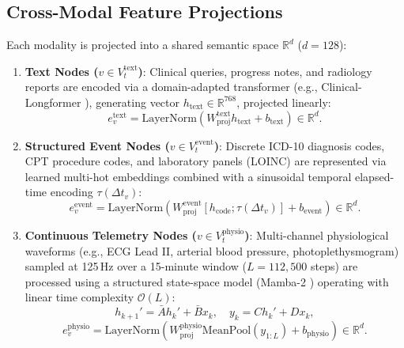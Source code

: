 \documentclass[ijds,dblanonrev]{informs4}
\newcommand{\R}{\mathbb{R}}
\begin{document}
\subsection{Cross-Modal Feature Projections}
Each modality is projected into a shared semantic space $\R^d$ ($d = 128$):
\begin{enumerate}[(1)]
  \item \textbf{Text Nodes ($v \in V_t^{\text{text}}$)}: Clinical queries, progress notes, and radiology reports are encoded via a domain-adapted transformer (e.g., Clinical-Longformer \citep{alsentzer2019publicly}), generating vector $h_{\text{text}} \in \R^{768}$, projected linearly:
  \begin{equation}
    e_v^{\text{text}} = \text{LayerNorm}(W_{\text{proj}}^{\text{text}} h_{\text{text}} + b_{\text{text}}) \in \R^d.
    \label{eq:text_proj}
  \end{equation}

  \item \textbf{Structured Event Nodes ($v \in V_t^{\text{event}}$)}: Discrete ICD-10 diagnosis codes, CPT procedure codes, and laboratory panels (LOINC) are represented via learned multi-hot embeddings combined with a sinusoidal temporal elapsed-time encoding $\tau(\Delta t_{v})$:
  \begin{equation}
    e_v^{\text{event}} = \text{LayerNorm}(W_{\text{proj}}^{\text{event}} [h_{\text{code}}; \tau(\Delta t_v)] + b_{\text{event}}) \in \R^d.
    \label{eq:event_proj}
  \end{equation}

  \item \textbf{Continuous Telemetry Nodes ($v \in V_t^{\text{physio}}$)}: Multi-channel physiological waveforms (e.g., ECG Lead II, arterial blood pressure, photoplethysmogram) sampled at 125\,Hz over a 15-minute window ($L = 112{,}500$ steps) are processed using a structured state-space model (Mamba-2 \citep{dao2024mamba2}) operating with linear time complexity $\mathcal{O}(L)$:
  \begin{equation}
    h_{k+1}' = \bar{A} h_k' + \bar{B} x_k, \quad y_k = C h_k' + D x_k,
    \label{eq:mamba_ssm}
  \end{equation}
  \begin{equation}
    e_v^{\text{physio}} = \text{LayerNorm}(W_{\text{proj}}^{\text{physio}} \text{MeanPool}(y_{1:L}) + b_{\text{physio}}) \in \R^d.
    \label{eq:physio_proj}
  \end{equation}
\end{enumerate}
\end{document}
